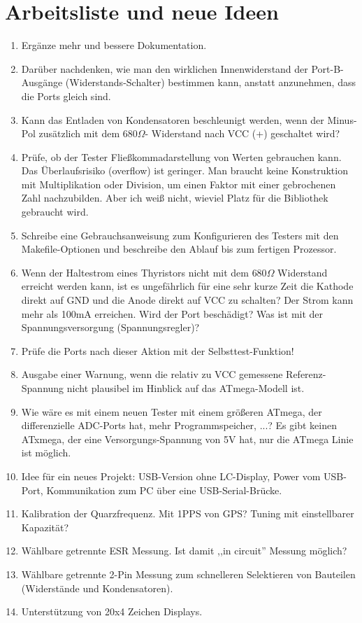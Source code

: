 
\chapter{Arbeitsliste und neue Ideen}
\label{sec:todo}

\begin{enumerate}
\item Ergänze mehr und bessere Dokumentation.
\item Darüber nachdenken, wie man den wirklichen Innenwiderstand der Port-B-Aus\-gän\-ge (Wider\-stands-Schal\-ter) bestimmen kann,
anstatt anzunehmen, dass die Ports gleich sind.
\item Kann das Entladen von Kondensatoren beschleunigt werden, wenn der Minus-Pol zusätzlich mit dem \(680\Omega\)-
Widerstand nach VCC (+) geschaltet wird?
\item Prüfe, ob der Tester Fließkommadarstellung von Werten gebrauchen kann.
Das Überlaufsrisiko (overflow) ist geringer.
Man braucht keine Konstruktion mit Multiplikation oder Division, um einen Faktor mit einer gebrochenen Zahl nachzubilden.
Aber ich weiß nicht, wieviel Platz für die Bibliothek gebraucht wird.
\item Schreibe eine Gebrauchsanweisung zum Konfigurieren des Testers mit den Makefile-Optionen und beschreibe
den Ablauf bis zum fertigen Prozessor.
\item Wenn der Haltestrom eines Thyristors nicht mit dem \(680\Omega\) Widerstand erreicht werden kann, 
ist es ungefährlich für eine sehr kurze Zeit die Kathode direkt auf GND und die Anode direkt auf VCC zu schalten?
Der Strom kann mehr als 100mA erreichen. Wird der Port beschädigt? Was ist mit der Spannungsversorgung (Spannungsregler)?
\item Prüfe die Ports nach dieser Aktion mit der Selbsttest-Funktion!
\item Ausgabe einer Warnung, wenn die relativ zu VCC gemessene Referenz-Spannung nicht plausibel im Hinblick auf das ATmega-Modell ist.
\item Wie wäre es mit einem neuen Tester mit einem größeren ATmega, der differenzielle ADC-Ports hat,
mehr Programmspeicher, ...?
Es gibt keinen ATxmega, der eine Versorgungs-Spannung von 5V hat, nur die ATmega Linie ist möglich.
\item Idee für ein neues Projekt: USB-Version ohne LC-Display, Power vom USB-Port, Kommunikation zum PC über eine USB-Serial-Brücke.
\item Kalibration der Quarzfrequenz. Mit 1PPS  von GPS? Tuning mit einstellbarer Kapazität?
\item Wählbare getrennte ESR Messung. Ist damit ,,in circuit'' Messung möglich?
\item Wählbare getrennte 2-Pin Messung zum schnelleren Selektieren von Bauteilen (Widerstände und Kondensatoren).
\item Unterstützung von 20x4 Zeichen Displays.
\end{enumerate}
